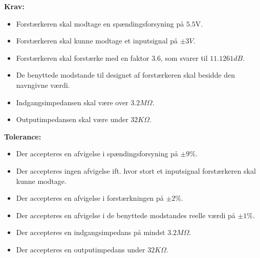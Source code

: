 \noindent\textbf{Krav:}
\begin{itemize}
	\item Forstærkeren skal modtage en spændingsforsyning på $5.5$V.
	\item Forstærkeren skal kunne modtage et inputsignal på $\pm3V$.
	\item Forstærkeren skal forstærke med en faktor $3.6$, som svarer til $11.1261dB$.
	\item De benyttede modstande til designet af forstærkeren skal besidde den navngivne værdi.
	\item Indgangsimpedansen skal være over $3.2M\Omega$.
	\item Outputimpedansen skal være under $32K\Omega$.
\end{itemize}
\noindent\textbf{Tolerance:}
\begin{itemize}
	\item Der accepteres en afvigelse i spændingsforsyning på $\pm9\%$.
	\item Der accepteres ingen afvigelse ift. hvor stort et inputsignal forstærkeren skal kunne modtage.
	\item Der accepteres en afvigelse i forstærkningen på $\pm2\%$.
	\item Der accepteres en afvigelse i de benyttede modstandes reelle værdi på $\pm1\%$.
	\item Der accepteres en indgangsimpedans på mindst $3.2M\Omega$.
	\item Der accepteres en outputimpedans under $32K\Omega$.
\end{itemize}
